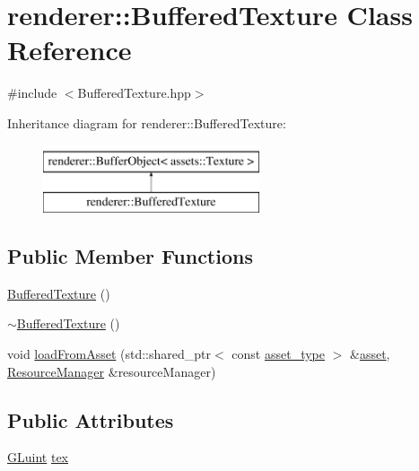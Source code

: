 \hypertarget{classrenderer_1_1BufferedTexture}{\section{renderer\-:\-:Buffered\-Texture Class Reference}
\label{classrenderer_1_1BufferedTexture}
}


{\ttfamily \#include $<$Buffered\-Texture.\-hpp$>$}

Inheritance diagram for renderer\-:\-:Buffered\-Texture\-:\begin{figure}[H]
\begin{center}
\leavevmode
\includegraphics[height=2.000000cm]{classrenderer_1_1BufferedTexture}
\end{center}
\end{figure}
\subsection*{Public Member Functions}
\begin{DoxyCompactItemize}
\item 
\hyperlink{classrenderer_1_1BufferedTexture_a85a564e4e15786e67fa6eb582e88e725}{Buffered\-Texture} ()
\item 
\hyperlink{classrenderer_1_1BufferedTexture_a7a38ba3cbe4e3cd3a28214e8952dfc39}{$\sim$\-Buffered\-Texture} ()
\item 
void \hyperlink{classrenderer_1_1BufferedTexture_a4bb8bcd23f843db0e47aec771b9e4a7a}{load\-From\-Asset} (std\-::shared\-\_\-ptr$<$ const \hyperlink{classrenderer_1_1BufferObject_a651cbaff8aa7148d72a9eaf71ad3636e}{asset\-\_\-type} $>$ \&\hyperlink{classrenderer_1_1BufferObject_ad747c7e09a4acda6847b6fca9977eed6}{asset}, \hyperlink{classrenderer_1_1ResourceManager}{Resource\-Manager} \&resource\-Manager)
\end{DoxyCompactItemize}
\subsection*{Public Attributes}
\begin{DoxyCompactItemize}
\item 
\hyperlink{Shader_8hpp_aa311c7f0d6ec4f1a33f9235c3651b86b}{G\-Luint} \hyperlink{classrenderer_1_1BufferedTexture_acee6f5c50f63247a6f52eb2fedf8d171}{tex}
\end{DoxyCompactItemize}
